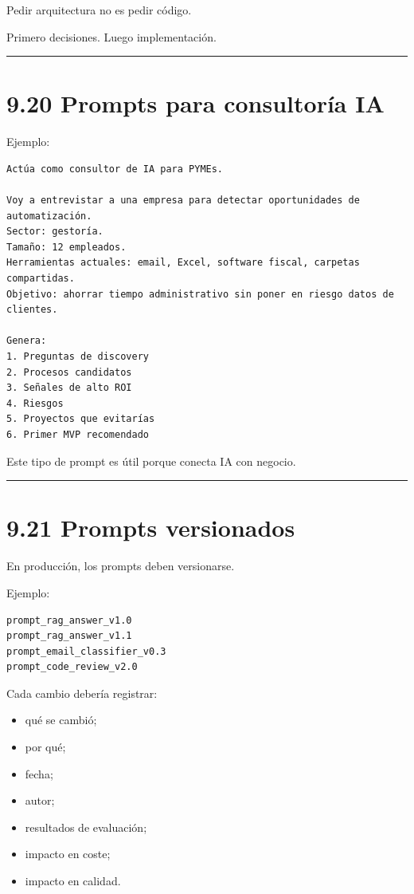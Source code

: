 Pedir arquitectura no es pedir código.

Primero decisiones. Luego implementación.

\begin{center}\rule{0.5\linewidth}{0.5pt}\end{center}

\section{9.20 Prompts para consultoría
IA}\label{prompts-para-consultoruxeda-ia}

Ejemplo:

\begin{lstlisting}
Actúa como consultor de IA para PYMEs.

Voy a entrevistar a una empresa para detectar oportunidades de automatización.
Sector: gestoría.
Tamaño: 12 empleados.
Herramientas actuales: email, Excel, software fiscal, carpetas compartidas.
Objetivo: ahorrar tiempo administrativo sin poner en riesgo datos de clientes.

Genera:
1. Preguntas de discovery
2. Procesos candidatos
3. Señales de alto ROI
4. Riesgos
5. Proyectos que evitarías
6. Primer MVP recomendado
\end{lstlisting}

Este tipo de prompt es útil porque conecta IA con negocio.

\begin{center}\rule{0.5\linewidth}{0.5pt}\end{center}

\section{9.21 Prompts versionados}\label{prompts-versionados}

En producción, los prompts deben versionarse.

Ejemplo:

\begin{lstlisting}
prompt_rag_answer_v1.0
prompt_rag_answer_v1.1
prompt_email_classifier_v0.3
prompt_code_review_v2.0
\end{lstlisting}

Cada cambio debería registrar:

\begin{itemize}
\tightlist
\item
  qué se cambió;
\item
  por qué;
\item
  fecha;
\item
  autor;
\item
  resultados de evaluación;
\item
  impacto en coste;
\item
  impacto en calidad.
\end{itemize}

